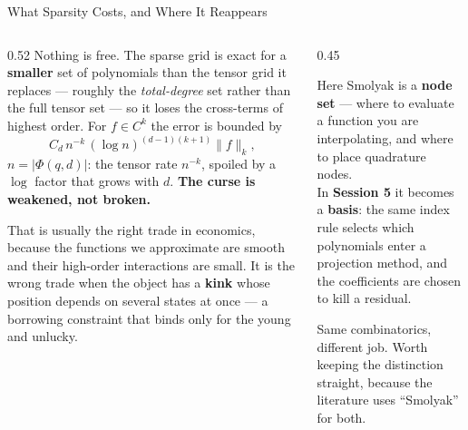 \begin{frame}{What Sparsity Costs, and Where It Reappears}
\begin{columns}[T]
\begin{column}{0.52\textwidth}
\small
Nothing is free. The sparse grid is exact for a \textbf{smaller} set of polynomials than the tensor grid it replaces --- roughly the \emph{total-degree} set rather than the full tensor set --- so it loses the cross-terms of highest order. For $f\in C^{k}$ the error is bounded by
\[
  C_{d}\,n^{-k}\,(\log n)^{(d-1)(k+1)}\lVert f\rVert_{k},
\]
$n=|\Phi(q,d)|$: the tensor rate $n^{-k}$, spoiled by a $\log$ factor that grows with $d$. \textbf{The curse is weakened, not broken.}
\medskip

That is usually the right trade in economics, because the functions we approximate are smooth and their high-order interactions are small. It is the wrong trade when the object has a \textbf{kink} whose position depends on several states at once --- a borrowing constraint that binds only for the young and unlucky.
\end{column}
\begin{column}{0.45\textwidth}
\begin{conceptbox}[title=\textbf{Two uses, one construction}]\small
Here Smolyak is a \textbf{node set} --- where to evaluate a function you are interpolating, and where to place quadrature nodes.\\[1mm]
In \textbf{Session 5} it becomes a \textbf{basis}: the same index rule selects which polynomials enter a projection method, and the coefficients are chosen to kill a residual.
\end{conceptbox}
\medskip
\begin{examplebox}\footnotesize
Same combinatorics, different job. Worth keeping the distinction straight, because the literature uses ``Smolyak'' for both.
\end{examplebox}
\end{column}
\end{columns}
\end{frame}

